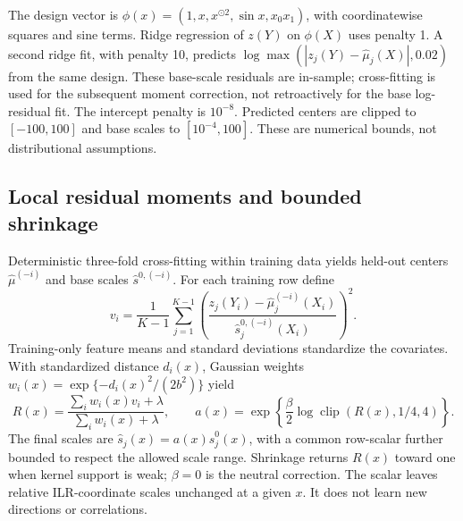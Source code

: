 \documentclass{article}
\newcommand{\clip}{\operatorname{clip}}
\begin{document}
The design vector is $\phi(x)=(1,x,x^{\odot2},\sin x,x_0x_1)$, with coordinatewise squares and sine terms. Ridge regression of $z(Y)$ on $\phi(X)$ uses penalty 1. A second ridge fit, with penalty 10, predicts $\log\max(|z_j(Y)-\widehat\mu_j(X)|,0.02)$ from the same design. These base-scale residuals are in-sample; cross-fitting is used for the subsequent moment correction, not retroactively for the base log-residual fit. The intercept penalty is $10^{-8}$. Predicted centers are clipped to $[-100,100]$ and base scales to $[10^{-4},100]$. These are numerical bounds, not distributional assumptions. %

\subsection{Local residual moments and bounded shrinkage}
Deterministic three-fold cross-fitting within training data yields held-out centers $\widehat\mu^{(-i)}$ and base scales $\widehat s^{0,(-i)}$. For each training row define
\begin{equation}
 v_i=\frac{1}{K-1}\sum_{j=1}^{K-1}
 \left(\frac{z_j(Y_i)-\widehat\mu_j^{(-i)}(X_i)}{\widehat s_j^{0,(-i)}(X_i)}\right)^2.
\end{equation}
Training-only feature means and standard deviations standardize the covariates. With standardized distance $d_i(x)$, Gaussian weights $w_i(x)=\exp\{-d_i(x)^2/(2b^2)\}$ yield
\begin{equation}
 R(x)=\frac{\sum_iw_i(x)v_i+\lambda}{\sum_iw_i(x)+\lambda},\qquad
 a(x)=\exp\!\left\{\frac{\beta}{2}\log\clip(R(x),1/4,4)\right\}.
 \label{eq:correction}
\end{equation}
The final scales are $\widehat s_j(x)=a(x)\widehat s^0_j(x)$, with a common row-scalar further bounded to respect the allowed scale range. Shrinkage returns $R(x)$ toward one when kernel support is weak; $\beta=0$ is the neutral correction. The scalar leaves relative ILR-coordinate scales unchanged at a given $x$. It does not learn new directions or correlations. %
\end{document}
